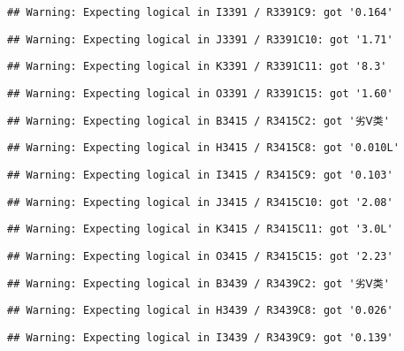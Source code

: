 \documentclass[
]{article}
\begin{document}
\begin{verbatim}
## Warning: Expecting logical in I3391 / R3391C9: got '0.164'
\end{verbatim}

\begin{verbatim}
## Warning: Expecting logical in J3391 / R3391C10: got '1.71'
\end{verbatim}

\begin{verbatim}
## Warning: Expecting logical in K3391 / R3391C11: got '8.3'
\end{verbatim}

\begin{verbatim}
## Warning: Expecting logical in O3391 / R3391C15: got '1.60'
\end{verbatim}

\begin{verbatim}
## Warning: Expecting logical in B3415 / R3415C2: got '劣Ⅴ类'
\end{verbatim}

\begin{verbatim}
## Warning: Expecting logical in H3415 / R3415C8: got '0.010L'
\end{verbatim}

\begin{verbatim}
## Warning: Expecting logical in I3415 / R3415C9: got '0.103'
\end{verbatim}

\begin{verbatim}
## Warning: Expecting logical in J3415 / R3415C10: got '2.08'
\end{verbatim}

\begin{verbatim}
## Warning: Expecting logical in K3415 / R3415C11: got '3.0L'
\end{verbatim}

\begin{verbatim}
## Warning: Expecting logical in O3415 / R3415C15: got '2.23'
\end{verbatim}

\begin{verbatim}
## Warning: Expecting logical in B3439 / R3439C2: got '劣Ⅴ类'
\end{verbatim}

\begin{verbatim}
## Warning: Expecting logical in H3439 / R3439C8: got '0.026'
\end{verbatim}

\begin{verbatim}
## Warning: Expecting logical in I3439 / R3439C9: got '0.139'
\end{verbatim}
\end{document}

